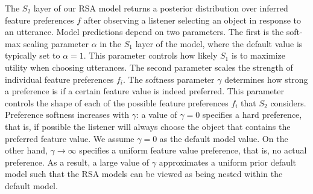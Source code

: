 \documentclass[10pt,a4paper]{article}
\newcommand{\gcs}[1]{\textcolor{blue}{[gcs: #1]}}
\begin{document}
The $S_2$ layer of our RSA model returns a posterior distribution over inferred feature preferences $f$ after observing a listener selecting an object in response to an utterance. 
Model predictions depend on two parameters.
The first is the soft-max scaling parameter $\alpha$ in the $S_1$ layer of the model, where the default value is typically set to $\alpha=1$. 
This parameter controls how likely $S_1$ is to maximize utility when choosing utterances. The second parameter scales the strength of individual feature preferences $f_i$. 
The softness parameter $\gamma$ determines how strong a preference is if a certain feature value is indeed preferred.
This parameter controls the shape of each of the possible feature preferences $f_i$ that $S_2$ considers. 
Preference softness increases with $\gamma$: 
a value of $\gamma=0$ specifies a hard preference, that is, if possible the listener will always choose the object that contains the preferred feature value. 
We assume $\gamma=0$ as the default model value. 
On the other hand, $\gamma \rightarrow \infty$ specifies a uniform feature value preference, that is, no actual preference.
As a result, a large value of $\gamma$ approximates a uniform prior default model such that the RSA models can be viewed as being nested within the default model.
\end{document}
